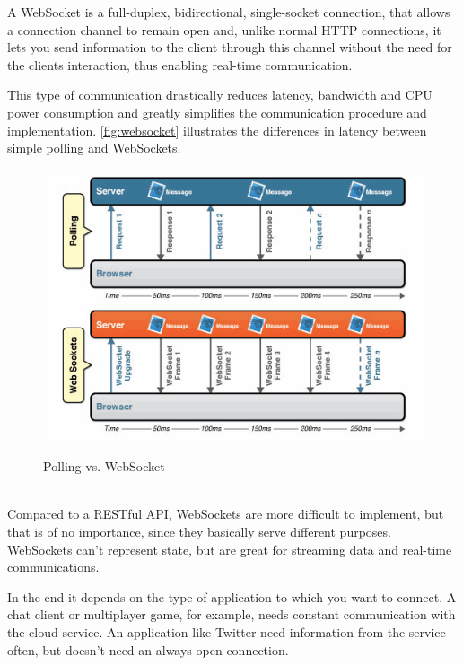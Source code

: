 A WebSocket is a full-duplex, bidirectional, single-socket connection, that allows a connection channel to remain open and, unlike normal HTTP connections, it lets you send information to the client through this channel without the need for the clients interaction, thus enabling real-time communication.

This type of communication drastically reduces latency, bandwidth and CPU power consumption and greatly simplifies the communication procedure and implementation. \cite{wang:2013} \autoref{fig:websocket} illustrates the differences in latency between simple polling and WebSockets.  

\begin{figure}[H]
    \begin{center}
        {\includegraphics[width=1\linewidth]{gfx/websocket}}
        \caption[Polling vs. WebSocket]{Polling vs. WebSocket\footnotemark}\label{fig:websocket}
    \end{center}
\end{figure}
\\

Compared to a RESTful API, WebSockets are more difficult to implement, but that is of no importance, since they basically serve different purposes. WebSockets can't represent state, but are great for streaming data and real-time communications.

In the end it depends on the type of application to which you want to connect. A chat client or multiplayer game, for example, needs constant communication with the cloud service. An application like Twitter need information from the service often, but doesn't need an always open connection.

